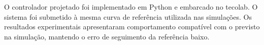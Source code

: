 O controlador projetado foi implementado em Python e embarcado no
\gls{tecolab}. O sistema foi submetido à mesma curva de referência utilizada nas
simulações. Os resultados experimentais apresentaram comportamento compatível
com o previsto na simulação, mantendo o erro de seguimento da referência baixo.
